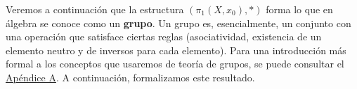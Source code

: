 Veremos a continuación que la estructura $(\pi_1(X, x_0), *)$ forma lo que en álgebra se conoce como un \textbf{grupo}. Un grupo es, esencialmente, un conjunto con una operación que satisface ciertas reglas (asociatividad, existencia de un elemento neutro y de inversos para cada elemento). Para una introducción más formal a los conceptos que usaremos de teoría de grupos, se puede consultar el \hyperref[apendice:teoria-de-grupos]{Apéndice A}. A continuación, formalizamos este resultado.


